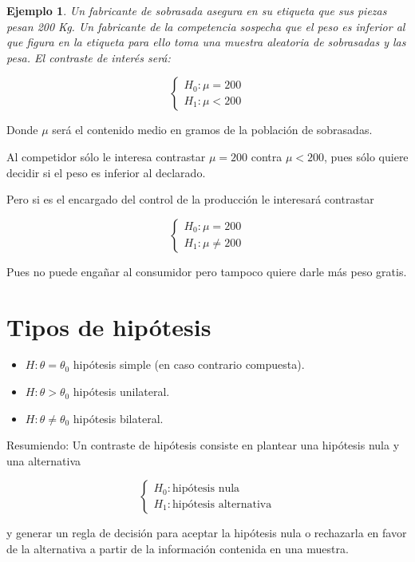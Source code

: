 \documentclass[12pt]{report}
\newtheorem{example}[definition]{Ejemplo}
\begin{document}
\begin{example}
Un fabricante de sobrasada asegura en su etiqueta que sus piezas pesan 200 Kg. Un
fabricante de la competencia sospecha que el peso es inferior al que figura en la
etiqueta para ello toma una muestra aleatoria de sobrasadas y las pesa. El contraste de
interés será:
\end{example}

$$\left\{\begin{array}{ll} H_{0}:\mu=200\\ H_{1}:\mu<200
\end{array}\right.$$

Donde $\mu$ será el contenido medio en gramos de la población de sobrasadas.

Al competidor sólo le interesa contrastar $\mu=200$ contra $\mu<200$, pues sólo quiere
decidir si el peso es inferior al declarado.

Pero si es el encargado del control de la producción le interesará contrastar


$$\left\{\begin{array}{ll} H_{0}:\mu=200\\ H_{1}:\mu\not=200
\end{array}\right.$$

Pues no puede engañar al consumidor pero tampoco quiere darle más peso gratis.


    \section{Tipos de hipótesis}
\begin{itemize}
    \item $H: \theta=\theta_{0}$ hipótesis simple (en caso contrario
    compuesta).

    \item $H: \theta>\theta_{0}$ hipótesis unilateral.

    \item $H: \theta\not=\theta_{0}$ hipótesis bilateral.
\end{itemize}

    Resumiendo: Un contraste de hipótesis consiste en plantear una
    hipótesis nula y una alternativa

    $$\left\{\begin{array}{ll}
H_{0}:\mbox{hipótesis nula}\\ H_{1}:\mbox{hipótesis alternativa}
\end{array}\right.$$

y generar un regla de decisión para aceptar la hipótesis nula o rechazarla en favor de la
alternativa a partir de la información contenida en una muestra.
\end{document}
